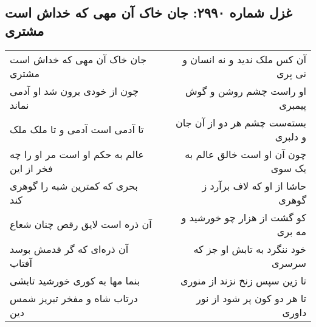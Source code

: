 \begin{center}
\section*{غزل شماره ۲۹۹۰: جان خاک آن مهی که خداش است مشتری}
\label{sec:2990}
\begin{longtable}{l p{0.5cm} r}
جان خاک آن مهی که خداش است مشتری
&&
آن کس ملک ندید و نه انسان و نی پری
\\
چون از خودی برون شد او آدمی نماند
&&
او راست چشم روشن و گوش پیمبری
\\
تا آدمی است آدمی و تا ملک ملک
&&
بسته‌ست چشم هر دو از آن جان و دلبری
\\
عالم به حکم او است مر او را چه فخر از این
&&
چون آن او است خالق عالم به یک سوی
\\
بحری که کمترین شبه را گوهری کند
&&
حاشا از او که لاف برآرد ز گوهری
\\
آن ذره است لایق رقص چنان شعاع
&&
کو گشت از هزار چو خورشید و مه بری
\\
آن ذره‌ای که گر قدمش بوسد آفتاب
&&
خود ننگرد به تابش او جز که سرسری
\\
بنما مها به کوری خورشید تابشی
&&
تا زین سپس زنخ نزند از منوری
\\
درتاب شاه و مفخر تبریز شمس دین
&&
تا هر دو کون پر شود از نور داوری
\\
\end{longtable}
\end{center}
